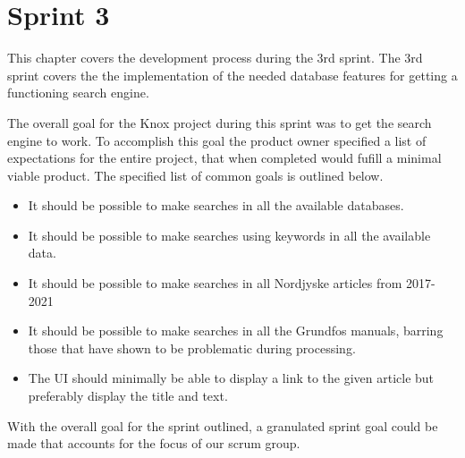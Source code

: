 \chapter{Sprint 3}
This chapter covers the development process during the 3rd sprint. The 3rd sprint covers the the implementation of the needed database features for getting a functioning search engine. 


The overall goal for the Knox project during this sprint was to get the search engine to work. To accomplish this goal the product owner specified a list of expectations for the entire \knox project, that when completed would fufill a minimal viable product. The specified list of common goals is outlined below.
\begin{itemize}
	\item It should be possible to make searches in all the available databases.
	\item It should be possible to make searches using keywords in all the available data.
	\item It should be possible to make searches in all Nordjyske articles from 2017-2021
	\item It should be possible to make searches in all the Grundfos manuals, barring those that have shown to be problematic during processing.
	\item The UI should minimally be able to display a link to the given article but preferably display the title and text.
\end{itemize}

With the overall goal for the sprint outlined, a granulated sprint goal could be made that accounts for the focus of our scrum group.







